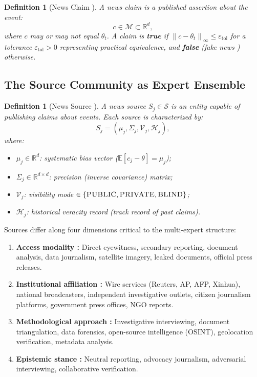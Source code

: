 \documentclass[11pt,a4paper]{article}
\newtheorem{definition}[theorem]{Definition}
\theoremstyle{definition}
\newcommand{\R}{\mathbb{R}}
\newcommand{\E}{\mathbb{E}}
\newcommand{\norm}[1]{\left\lVert#1\right\rVert}
\newcommand{\claimSpace}{\mathcal{M}}
\newcommand{\sourceSet}{\mathcal{S}}
\newcommand{\VISpublic}{\textsc{PUBLIC}}
\newcommand{\VISprivate}{\textsc{PRIVATE}}
\newcommand{\VISblind}{\textsc{BLIND}}
\begin{document}
\begin{definition}[News Claim ]
\label{def:claim}
A news claim is a published assertion about the event:
\begin{equation}
    c \in \claimSpace \subset \R^d,
    \label{eq:claim}
\end{equation}
where $c$ may or may not equal $\theta_t$. A claim is \textbf{true} if $\norm{c - \theta_t}_\infty \leq \varepsilon_{\mathrm{tol}}$ for a tolerance $\varepsilon_{\mathrm{tol}} > 0$ representing practical equivalence, and \textbf{false} (fake news ) otherwise.
\end{definition}

\subsection{The Source Community as Expert Ensemble }

\begin{definition}[News Source ]
\label{def:source}
A news source $S_j \in \sourceSet$ is an entity capable of publishing claims about events. Each source is characterized by:
\begin{equation}
    S_j = (\mu_j, \Sigma_j, \mathcal{V}_j, \mathcal{H}_j),
    \label{eq:source_profile}
\end{equation}
where:
\begin{itemize}
    \item $\mu_j \in \R^d$: systematic bias vector ($\E[c_j - \theta] = \mu_j$);
    \item $\Sigma_j \in \R^{d \times d}$: precision (inverse covariance) matrix;
    \item $\mathcal{V}_j$: visibility mode $\in \{\VISpublic, \VISprivate, \VISblind\}$;
    \item $\mathcal{H}_j$: historical veracity record (track record of past claims).
\end{itemize}
\end{definition}

Sources differ along four dimensions critical to the multi-expert structure:
\begin{enumerate}[label=(\roman*)]
    \item \textbf{Access modality :} Direct eyewitness, secondary reporting, document analysis, data journalism, satellite imagery, leaked documents, official press releases.
    \item \textbf{Institutional affiliation :} Wire services (Reuters, AP, AFP, Xinhua), national broadcasters, independent investigative outlets, citizen journalism platforms, government press offices, NGO reports.
    \item \textbf{Methodological approach :} Investigative interviewing, document triangulation, data forensics, open-source intelligence (OSINT), geolocation verification, metadata analysis.
    \item \textbf{Epistemic stance :} Neutral reporting, advocacy journalism, adversarial interviewing, collaborative verification.
\end{enumerate}
\end{document}
